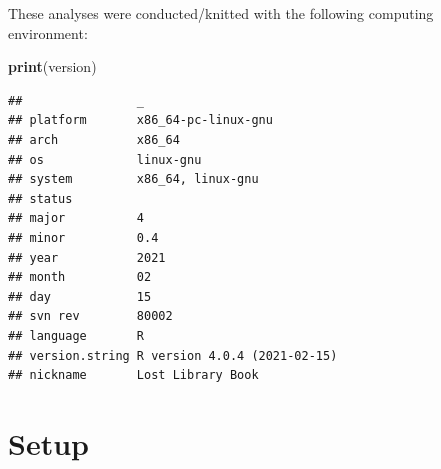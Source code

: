 \documentclass[]{book}
\newenvironment{Shaded}{\begin{snugshade}}{\end{snugshade}}
\newcommand{\KeywordTok}[1]{\textcolor[rgb]{0.13,0.29,0.53}{\textbf{#1}}}
\newcommand{\NormalTok}[1]{#1}
\begin{document}
These analyses were conducted/knitted with the following computing environment:

\begin{Shaded}
\begin{Highlighting}[]
\KeywordTok{print}\NormalTok{(version)}
\end{Highlighting}
\end{Shaded}

\begin{verbatim}
##                _                           
## platform       x86_64-pc-linux-gnu         
## arch           x86_64                      
## os             linux-gnu                   
## system         x86_64, linux-gnu           
## status                                     
## major          4                           
## minor          0.4                         
## year           2021                        
## month          02                          
## day            15                          
## svn rev        80002                       
## language       R                           
## version.string R version 4.0.4 (2021-02-15)
## nickname       Lost Library Book
\end{verbatim}

\hypertarget{setup-1}{%
\section{Setup}\label{setup-1}}
\end{document}
